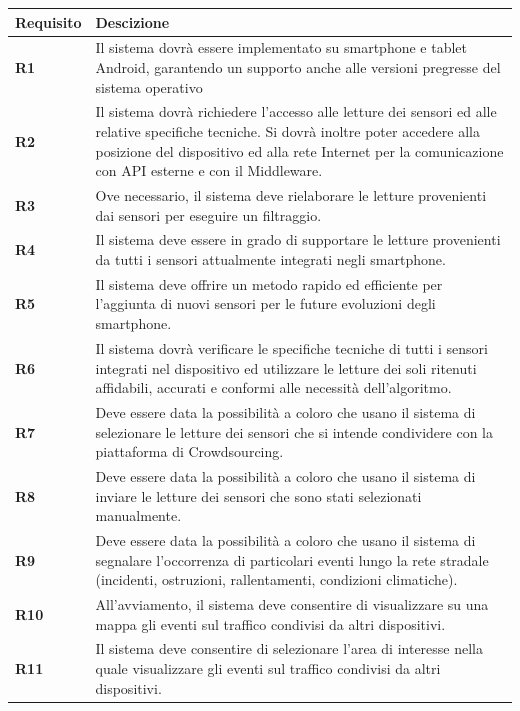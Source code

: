 \begin{longtable}{|m{2cm}|m{12cm}|}
			\hline
			\textbf{Requisito} & \textbf{Descizione} \\
			\hline
			\textbf{R1} &   Il sistema dovrà essere implementato su smartphone e tablet Android, garantendo un supporto anche alle versioni pregresse del sistema operativo \\
			\hline
			\textbf{R2} &   Il sistema dovrà richiedere l'accesso alle letture dei sensori ed alle relative specifiche tecniche. Si dovrà inoltre poter accedere alla posizione del dispositivo ed alla rete Internet per la comunicazione con API esterne e con il Middleware. \\
			\hline
			\textbf{R3} &   Ove necessario, il sistema deve rielaborare le letture provenienti dai sensori per eseguire un filtraggio. \\
			\hline
			\textbf{R4} &   Il sistema deve essere in grado di supportare le letture provenienti da tutti i sensori attualmente integrati negli smartphone. \\
			\hline
			\textbf{R5} &   Il sistema deve offrire un metodo rapido ed efficiente per l'aggiunta di nuovi sensori per le future evoluzioni degli smartphone. \\
			\hline
			\textbf{R6} &   Il sistema dovrà verificare le specifiche tecniche di tutti i sensori integrati nel dispositivo ed utilizzare le letture dei soli ritenuti affidabili, accurati e conformi alle necessità dell'algoritmo. \\
			\hline
			\textbf{R7} &   Deve essere data la possibilità a coloro che usano il sistema di selezionare le letture dei sensori che si intende condividere con la piattaforma di Crowdsourcing.  \\
			\hline
			\textbf{R8} &   Deve essere data la possibilità a coloro che usano il sistema di inviare le letture dei sensori che sono stati selezionati manualmente.  \\
			\hline
			\textbf{R9} &   Deve essere data la possibilità a coloro che usano il sistema di segnalare l'occorrenza di particolari eventi lungo la rete stradale (incidenti, ostruzioni, rallentamenti, condizioni climatiche).  \\
			\hline
			\textbf{R10} &   All'avviamento, il sistema deve consentire di visualizzare su una mappa gli eventi sul traffico condivisi da altri dispositivi.  \\
			\hline
			\textbf{R11} &   Il sistema deve consentire di selezionare l'area di interesse nella quale visualizzare gli eventi sul traffico condivisi da altri dispositivi.  \\

\end{longtable}
